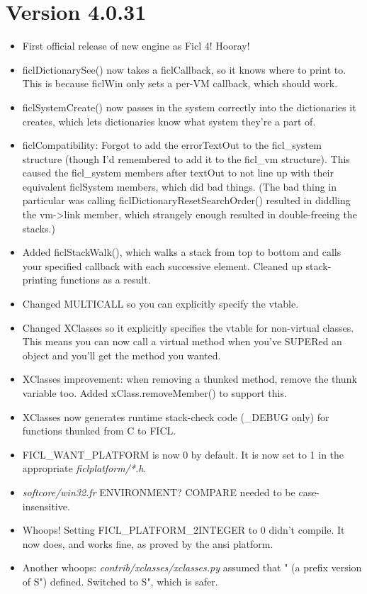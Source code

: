 \section*{Version 4.0.31}
\begin{itemize}[noitemsep]
	\item First official release of new engine as Ficl 4! Hooray!

	\item ficlDictionarySee() now takes a ficlCallback, so it knows
	where to print to. This is because ficlWin only sets a per-VM
	callback, which should work.

	\item ficlSystemCreate() now passes in the system correctly into
	the dictionaries it creates, which lets dictionaries know what
	system they're a part of.

	\item ficlCompatibility: Forgot to add the errorTextOut to the
	ficl\_system structure (though I'd remembered to add it to the
	ficl\_vm structure). This caused the ficl\_system members after
	textOut to not line up with their equivalent ficlSystem members,
	which did bad things. (The bad thing in particular was calling
	ficlDictionaryResetSearchOrder() resulted in diddling the
	vm-\textgreater link member, which strangely enough resulted in
	double-freeing the stacks.)

	\item Added ficlStackWalk(), which walks a stack from top to
	bottom and calls your specified callback with each successive
	element. Cleaned up stack-printing functions as a result.

	\item Changed MULTICALL so you can explicitly specify the vtable.

	\item Changed XClasses so it explicitly specifies the vtable for
	non-virtual classes. This means you can now call a virtual
	method when you've SUPERed an object and you'll get the method
	you wanted.

	\item XClasses improvement: when removing a thunked method,
	remove the thunk variable too. Added xClass.removeMember() to
	support this.

	\item XClasses now generates runtime stack-check code (\_DEBUG
	only) for functions thunked from C to FICL.

	\item FICL\_WANT\_PLATFORM is now 0 by default. It is now set
	to 1 in the appropriate \textit{ficlplatform/*.h}.

	\item \textit{softcore/win32.fr} ENVIRONMENT? COMPARE needed to
	be case-insensitive.

	\item Whoops! Setting FICL\_PLATFORM\_2INTEGER to 0 didn't
	compile. It now does, and works fine, as proved by the ansi
	platform.

	\item Another whoops: \textit{contrib/xclasses/xclasses.py}
	assumed that " (a prefix version of S") defined. Switched to S",
	which is safer.
\end{itemize}


